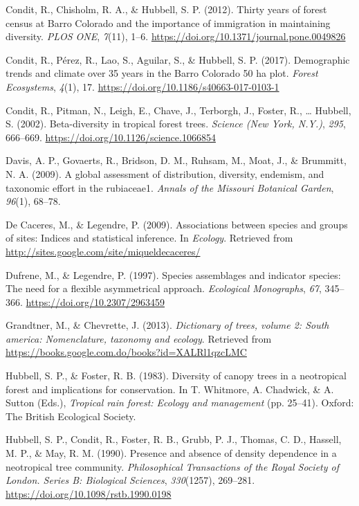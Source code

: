 \documentclass[11pt,]{article}
\begin{document}
\hypertarget{ref-condit_et_al_2012}{}
Condit, R., Chisholm, R. A., \& Hubbell, S. P. (2012). Thirty years of
forest census at Barro Colorado and the importance of immigration in
maintaining diversity. \emph{PLOS ONE}, \emph{7}(11), 1--6.
\url{https://doi.org/10.1371/journal.pone.0049826}

\hypertarget{ref-condit_et_al_2017}{}
Condit, R., Pérez, R., Lao, S., Aguilar, S., \& Hubbell, S. P. (2017).
Demographic trends and climate over 35 years in the Barro Colorado 50 ha
plot. \emph{Forest Ecosystems}, \emph{4}(1), 17.
\url{https://doi.org/10.1186/s40663-017-0103-1}

\hypertarget{ref-article_condit}{}
Condit, R., Pitman, N., Leigh, E., Chave, J., Terborgh, J., Foster, R.,
\ldots{} Hubbell, S. (2002). Beta-diversity in tropical forest trees.
\emph{Science (New York, N.Y.)}, \emph{295}, 666--669.
\url{https://doi.org/10.1126/science.1066854}

\hypertarget{ref-davis2009global}{}
Davis, A. P., Govaerts, R., Bridson, D. M., Ruhsam, M., Moat, J., \&
Brummitt, N. A. (2009). A global assessment of distribution, diversity,
endemism, and taxonomic effort in the rubiaceae1. \emph{Annals of the
Missouri Botanical Garden}, \emph{96}(1), 68--78.

\hypertarget{ref-cita_indicspecies}{}
De Caceres, M., \& Legendre, P. (2009). Associations between species and
groups of sites: Indices and statistical inference. In \emph{Ecology}.
Retrieved from \url{http://sites.google.com/site/miqueldecaceres/}

\hypertarget{ref-dufrene_legendre}{}
Dufrene, M., \& Legendre, P. (1997). Species assemblages and indicator
species: The need for a flexible asymmetrical approach. \emph{Ecological
Monographs}, \emph{67}, 345--366. \url{https://doi.org/10.2307/2963459}

\hypertarget{ref-grandtner2013dictionary}{}
Grandtner, M., \& Chevrette, J. (2013). \emph{Dictionary of trees,
volume 2: South america: Nomenclature, taxonomy and ecology}. Retrieved
from \url{https://books.google.com.do/books?id=XALRl1qzcLMC}

\hypertarget{ref-hubell_foster_1983}{}
Hubbell, S. P., \& Foster, R. B. (1983). Diversity of canopy trees in a
neotropical forest and implications for conservation. In T. Whitmore, A.
Chadwick, \& A. Sutton (Eds.), \emph{Tropical rain forest: Ecology and
management} (pp. 25--41). Oxford: The British Ecological Society.

\hypertarget{ref-hubell_et_all_1990}{}
Hubbell, S. P., Condit, R., Foster, R. B., Grubb, P. J., Thomas, C. D.,
Hassell, M. P., \& May, R. M. (1990). Presence and absence of density
dependence in a neotropical tree community. \emph{Philosophical
Transactions of the Royal Society of London. Series B: Biological
Sciences}, \emph{330}(1257), 269--281.
\url{https://doi.org/10.1098/rstb.1990.0198}
\end{document}
